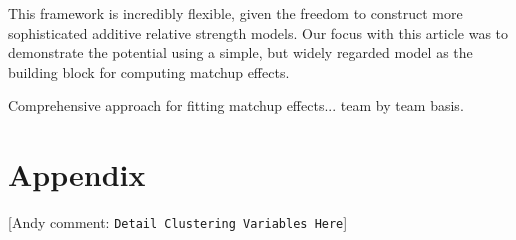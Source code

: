\documentclass[letterpaper,12pt]{article}
\newcommand{\andyc}[1]{[{\color{red}\sc Andy comment: {\tt #1}}]}
\begin{document}
This framework is incredibly flexible, given the freedom to construct more sophisticated additive relative strength models. Our focus with this article was to demonstrate the potential using a simple, but widely regarded model as the building block for computing matchup effects.


Comprehensive approach for fitting matchup effects... team by team basis.
\section*{Appendix}
\andyc{Detail Clustering Variables Here}








\end{document}
